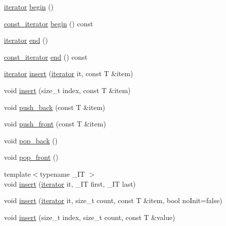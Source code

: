 \begin{DoxyCompactItemize}
\item 
\hyperlink{classfm_1_1vector_a45a46984d2c34a4b3a21a8f8532fa213}{iterator} \hyperlink{classfm_1_1vector_ae4af099a48b9b51c926d40fb3fe56b31}{begin} ()
\item 
\hyperlink{classfm_1_1vector_aa012e8933574a62a4cc52e186a917722}{const\_\-iterator} \hyperlink{classfm_1_1vector_a11357e78f024def810002bd91b6ab667}{begin} () const 
\item 
\hyperlink{classfm_1_1vector_a45a46984d2c34a4b3a21a8f8532fa213}{iterator} \hyperlink{classfm_1_1vector_a87f5d1c033680ba062cb1951ecd5595d}{end} ()
\item 
\hyperlink{classfm_1_1vector_aa012e8933574a62a4cc52e186a917722}{const\_\-iterator} \hyperlink{classfm_1_1vector_a48a32b5de0f77077977cc0a8e6f8b37b}{end} () const 
\item 
\hyperlink{classfm_1_1vector_a45a46984d2c34a4b3a21a8f8532fa213}{iterator} \hyperlink{classfm_1_1vector_a117615ac33b7890613a13bc674bb4529}{insert} (\hyperlink{classfm_1_1vector_a45a46984d2c34a4b3a21a8f8532fa213}{iterator} it, const T \&item)
\item 
void \hyperlink{classfm_1_1vector_a9cd731919c2cbf57102b156fe67895bb}{insert} (size\_\-t index, const T \&item)
\item 
void \hyperlink{classfm_1_1vector_a09016ff1f6226fce15c0993f52d5c155}{push\_\-back} (const T \&item)
\item 
void \hyperlink{classfm_1_1vector_a3e0364c3fae8fb7801c6ca05c6872eb1}{push\_\-front} (const T \&item)
\item 
void \hyperlink{classfm_1_1vector_a447dc8502b9c1eb3bb316ea9788bda61}{pop\_\-back} ()
\item 
void \hyperlink{classfm_1_1vector_aea5cb77b0f70764e54c03e192310521b}{pop\_\-front} ()
\item 
{\footnotesize template$<$typename \_\-IT $>$ }\\void \hyperlink{classfm_1_1vector_a1f778b3d9941904bd0cace86d0109a30}{insert} (\hyperlink{classfm_1_1vector_a45a46984d2c34a4b3a21a8f8532fa213}{iterator} it, \_\-IT first, \_\-IT last)
\item 
void \hyperlink{classfm_1_1vector_a39812dc74227136c64862337172b1f4a}{insert} (\hyperlink{classfm_1_1vector_a45a46984d2c34a4b3a21a8f8532fa213}{iterator} it, size\_\-t count, const T \&item, bool noInit=false)
\item 
void \hyperlink{classfm_1_1vector_ad0035a65758999231e441ac16aa457f2}{insert} (size\_\-t index, size\_\-t count, const T \&value)
\item 

\end{DoxyCompactItemize}
